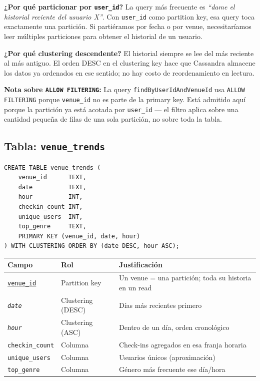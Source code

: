 \documentclass[12pt, a4paper]{article}
\newcommand{\code}[1]{\texttt{#1}}
\newcommand{\pk}[1]{\underline{\texttt{#1}}}   %
\newcommand{\ck}[1]{\texttt{\textit{#1}}}       %
\begin{document}
\vspace{0.5em}
\textbf{¿Por qué particionar por \code{user\_id}?}
La query más frecuente es \emph{``dame el historial reciente del usuario X''}.
Con \code{user\_id} como partition key, esa query toca exactamente una
partición. Si partiéramos por fecha o por venue, necesitaríamos leer
múltiples particiones para obtener el historial de un usuario.

\textbf{¿Por qué clustering descendente?}
El historial siempre se lee del más reciente al más antiguo. El orden DESC
en el clustering key hace que Cassandra almacene los datos ya ordenados
en ese sentido; no hay costo de reordenamiento en lectura.

\textbf{Nota sobre \code{ALLOW FILTERING}:}
La query \code{findByUserIdAndVenueId} usa \code{ALLOW FILTERING} porque
\code{venue\_id} no es parte de la primary key. Está admitido aquí porque
la partición ya está acotada por \code{user\_id} — el filtro aplica sobre
una cantidad pequeña de filas de una sola partición, no sobre toda la tabla.

\subsection{Tabla: \code{venue\_trends}}

\begin{lstlisting}[style=cypher, caption={CQL equivalente de VenueTrend}]
CREATE TABLE venue_trends (
    venue_id      TEXT,
    date          TEXT,
    hour          INT,
    checkin_count INT,
    unique_users  INT,
    top_genre     TEXT,
    PRIMARY KEY (venue_id, date, hour)
) WITH CLUSTERING ORDER BY (date DESC, hour ASC);
\end{lstlisting}

\begin{tabularx}{\textwidth}{@{}llX@{}}
  \toprule
  \textbf{Campo}        & \textbf{Rol}              & \textbf{Justificación} \\
  \midrule
  \pk{venue\_id}        & Partition key             & Un venue = una partición; toda su historia en un read \\
  \ck{date}             & Clustering (DESC)         & Días más recientes primero \\
  \ck{hour}             & Clustering (ASC)          & Dentro de un día, orden cronológico \\
  \code{checkin\_count} & Columna                   & Check-ins agregados en esa franja horaria \\
  \code{unique\_users}  & Columna                   & Usuarios únicos (aproximación) \\
  \code{top\_genre}     & Columna                   & Género más frecuente ese día/hora \\
  \bottomrule
\end{tabularx}
\end{document}

